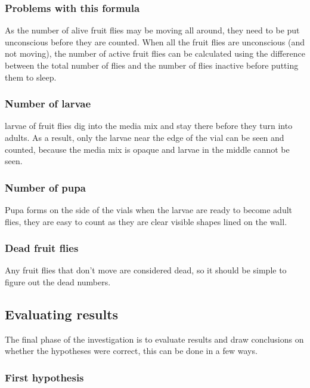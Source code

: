 \documentclass{article}
\begin{document}
\newpage

\subsubsection{Problems with this formula}


As the number of alive fruit flies may be moving all around, they need to be put unconscious before they are counted. When all the fruit flies are unconscious (and not moving), the number of active fruit flies can be calculated using the difference between the total number of flies and the number of flies inactive before putting them to sleep.

\subsubsection{Number of larvae}

larvae of fruit flies dig into the media mix and stay there before they turn into adults. As a result, only the larvae near the edge of the vial can be seen and counted, because the media mix is opaque and larvae in the middle cannot be seen.

\subsubsection{Number of pupa}

Pupa forms on the side of the vials when the larvae are ready to become adult flies, they are easy to count as they are clear visible shapes lined on the wall.

\subsubsection{Dead fruit flies}

Any fruit flies that don't move are considered dead, so it should be simple to figure out the dead numbers.

\subsection{Evaluating results}

The final phase of the investigation is to evaluate results and draw conclusions on whether the hypotheses were correct, this can be done in a few ways.

\subsubsection{First hypothesis}
\end{document}

